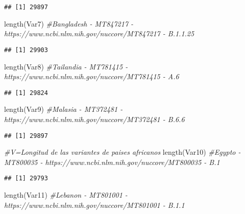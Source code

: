 \documentclass[
]{article}
\newenvironment{Shaded}{\begin{snugshade}}{\end{snugshade}}
\newcommand{\CommentTok}[1]{\textcolor[rgb]{0.56,0.35,0.01}{\textit{#1}}}
\newcommand{\FunctionTok}[1]{\textcolor[rgb]{0.00,0.00,0.00}{#1}}
\newcommand{\NormalTok}[1]{#1}
\begin{document}
\begin{verbatim}
## [1] 29897
\end{verbatim}

\begin{Shaded}
\begin{Highlighting}[]
\FunctionTok{length}\NormalTok{(Var7) }\CommentTok{\#Bangladesh {-} MT847217 {-}  https://www.ncbi.nlm.nih.gov/nuccore/MT847217 {-} B.1.1.25}
\end{Highlighting}
\end{Shaded}

\begin{verbatim}
## [1] 29903
\end{verbatim}

\begin{Shaded}
\begin{Highlighting}[]
\FunctionTok{length}\NormalTok{(Var8) }\CommentTok{\#Tailandia {-} MT781415 {-} https://www.ncbi.nlm.nih.gov/nuccore/MT781415 {-} A.6}
\end{Highlighting}
\end{Shaded}

\begin{verbatim}
## [1] 29824
\end{verbatim}

\begin{Shaded}
\begin{Highlighting}[]
\FunctionTok{length}\NormalTok{(Var9) }\CommentTok{\#Malasia {-} MT372481 {-} https://www.ncbi.nlm.nih.gov/nuccore/MT372481 {-} B.6.6}
\end{Highlighting}
\end{Shaded}

\begin{verbatim}
## [1] 29897
\end{verbatim}

\begin{Shaded}
\begin{Highlighting}[]
\CommentTok{\#V=Longitud de las variantes de paises africanos}
\FunctionTok{length}\NormalTok{(Var10) }\CommentTok{\#Egypto {-} MT800035 {-} https://www.ncbi.nlm.nih.gov/nuccore/MT800035 {-} B.1}
\end{Highlighting}
\end{Shaded}

\begin{verbatim}
## [1] 29793
\end{verbatim}

\begin{Shaded}
\begin{Highlighting}[]
\FunctionTok{length}\NormalTok{(Var11) }\CommentTok{\#Lebanon {-} MT801001 {-} https://www.ncbi.nlm.nih.gov/nuccore/MT801001 {-} B.1.1}
\end{Highlighting}
\end{Shaded}
\end{document}
